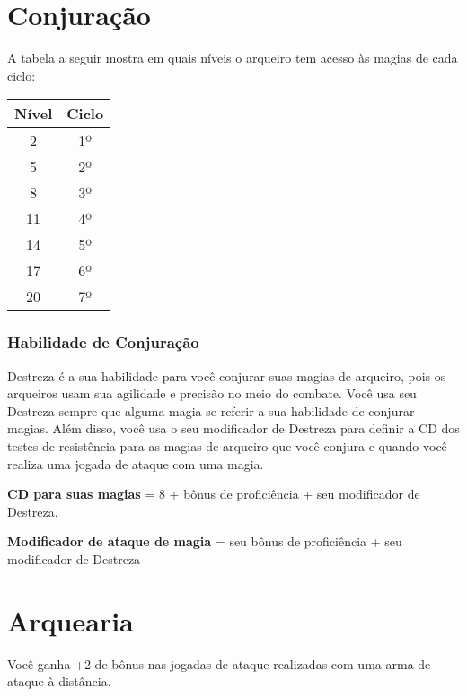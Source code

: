 \documentclass{RPG_Adventure}[2021/10/20]
\begin{document}
\begin{multicols}{2}
\section*{Conjuração}%

A tabela a seguir mostra em quais níveis o arqueiro tem acesso às magias de cada
ciclo:

\begin{center}
\begin{tabular}{|||c||c|||}
    \hline
    \textbf{Nível} & \textbf{Ciclo} \\
    \hline
    2 & 1º \\
    \hline
    5 & 2º \\
    \hline
    8 & 3º \\
    \hline
    11 & 4º \\
    \hline
    14 & 5º \\
    \hline
    17 & 6º \\
    \hline
    20 & 7º \\
    \hline
\end{tabular}
\end{center}

\subsubsection*{Habilidade de Conjuração}%

Destreza é a sua habilidade para você conjurar suas magias de arqueiro, pois os
arqueiros usam sua agilidade e precisão no meio do combate.  Você usa seu
Destreza sempre que alguma magia se referir a sua habilidade de conjurar magias.
Além disso, você usa o seu modificador de Destreza para definir a CD dos testes
de resistência para as magias de arqueiro que você conjura e quando você realiza
uma jogada de ataque com uma magia.

\begin{center}
\textbf{CD para suas magias} = 8 + bônus de proficiência + seu modificador de
Destreza. \nl

\textbf{Modificador de ataque de magia} = seu bônus de proficiência + seu
modificador de Destreza
\end{center}

\section*{Arquearia}%

Você ganha +2 de bônus nas jogadas de ataque realizadas com uma arma de ataque à
distância.


\end{multicols}
\end{document}
